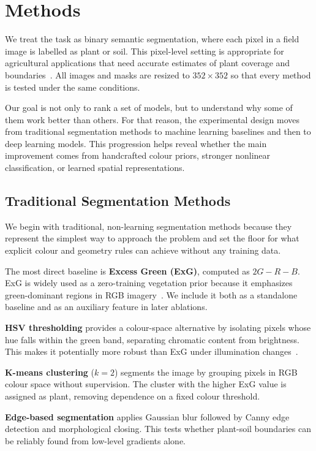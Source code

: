 \documentclass[conference]{IEEEtran}
\begin{document}
\section{Methods}

We treat the task as binary semantic segmentation, where each pixel in a
field image is labelled as plant or soil. This pixel-level setting is
appropriate for agricultural applications that need accurate estimates
of plant coverage and boundaries~\cite{long2015}. All images and masks
are resized to $352 \times 352$ so that every method is tested under
the same conditions.

Our goal is not only to rank a set of models, but to understand why
some of them work better than others. For that reason, the experimental
design moves from traditional segmentation methods to machine learning
baselines and then to deep learning models. This progression helps
reveal whether the main improvement comes from handcrafted colour
priors, stronger nonlinear classification, or learned spatial
representations.

\subsection{Traditional Segmentation Methods}

We begin with traditional, non-learning segmentation methods because
they represent the simplest way to approach the problem and set the
floor for what explicit colour and geometry rules can achieve without
any training data.

The most direct baseline is \textbf{Excess Green (ExG)}, computed as
$2G - R - B$. ExG is widely used as a zero-training vegetation prior
because it emphasizes green-dominant regions in RGB
imagery~\cite{woebbecke1995}. We include it both as a standalone
baseline and as an auxiliary feature in later ablations.

\textbf{HSV thresholding} provides a colour-space alternative by
isolating pixels whose hue falls within the green band, separating
chromatic content from brightness. This makes it potentially more
robust than ExG under illumination changes~\cite{smith1978}.

\textbf{K-means clustering} ($k{=}2$) segments the image by grouping
pixels in RGB colour space without supervision. The cluster with the
higher ExG value is assigned as plant, removing dependence on a fixed
colour threshold.

\textbf{Edge-based segmentation} applies Gaussian blur followed by
Canny edge detection and morphological closing. This tests whether
plant-soil boundaries can be reliably found from low-level gradients
alone.
\end{document}
